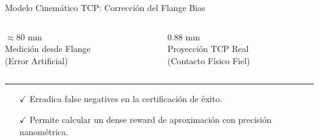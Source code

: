 \begin{frame}{Modelo Cinemático TCP: Corrección del Flange Bias}
\begin{columns}[T, onlytextwidth]
    \begin{column}{0.485\textwidth}
      \begin{tcolorbox}[
        enhanced,
        colback=AgriGreenLight,
        colframe=AgriGreen,
        arc=\CardArc,
        boxrule=\CardRule,
        height=\CardHeightDouble,
        title={\CardTitleFont Impacto en la Evaluación de Políticas},
        colbacktitle=AgriGreen,
        coltitle=WhiteBg,
        top=1.2mm, bottom=1.2mm, left=1.8mm, right=1.8mm
      ]
        \centering
        \begin{columns}[T, onlytextwidth]
          \begin{column}{0.48\textwidth}
            \centering
            \textcolor{AlertRed}{\KpiNumberFont $\approx 80\text{ mm}$}\\[0.2mm]
            {\KpiLabelFont Medición desde Flange\\(Error Artificial)}
          \end{column}
          \begin{column}{0.48\textwidth}
            \centering
            \textcolor{AgriGreen}{\KpiNumberFont $0.88\text{ mm}$}\\[0.2mm]
            {\KpiLabelFont Proyección TCP Real\\(Contacto Físico Fiel)}
          \end{column}
        \end{columns}
        \vspace{1mm}\hrule\vspace{1mm}
        {\BodyFont
        \begin{itemize}\setlength{\itemsep}{1.2pt}
          \item[\textcolor{AgriGreen}{\textbf{$\checkmark$}}] Erradica false negatives en la certificación de éxito.
          \item[\textcolor{AgriGreen}{\textbf{$\checkmark$}}] Permite calcular un dense reward de aproximación con precisión nanométrica.
        \end{itemize}}
      \end{tcolorbox}
    \end{column}
  \end{columns}
\end{frame}

